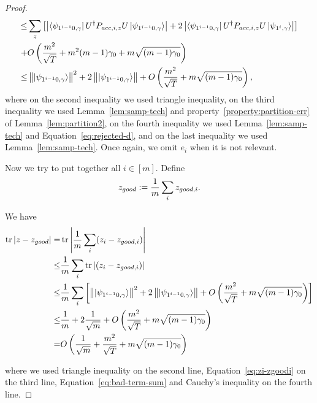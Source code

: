 \begin{proof}
\begin{align}
    \leq&  \sum_z   \L[\L| \bra{\psi_{1^{i-1}0,\gamma}}U^\dag  P_{acc,i,z}U    \ket{\psi_{1^{i-1}0,\gamma}} \R|+
    2  \L|\bra{\psi_{1^{i-1}0,\gamma}}U^\dag  P_{acc,i,z}U \ket{\psi_{1^i,\gamma}} \R|  \R]    \nn \\ +&O\L(\frac{m^2}{\sqrt T}+m^2{(m-1)\gamma_0}+m\sqrt{(m-1)\gamma_0}\R)\nn \\ %
    \leq& \norm{\ket{\psi_{1^{i-1}0,\gamma}}}^2+ 2\norm{\ket{\psi_{1^{i-1}0,\gamma}}}+O\L(\frac{m^2}{\sqrt T}+m\sqrt{(m-1)\gamma_0}\R),
\end{align}
where on the second inequality we used triangle inequality, on the third inequality we used  Lemma~\ref{lem:samp-tech} and property~\ref{property:partition-err} of Lemma~\ref{lem:partition2}, on the fourth inequality we used Lemma~\ref{lem:samp-tech} and Equation~\ref{eq:rejected-d}, and on the last inequality we used Lemma~\ref{lem:samp-tech}. Once again, we omit $e_i$ when it is not relevant. 







Now we try to  put together all $i\in [m]$. Define
$$z_{good}:= \frac{1}{m}\sum_i z_{good,i}.$$

We have 
\begin{align} \label{eq:z-z-good}
    \tr|z-z_{good}| =& \tr\L|\frac{1}{m}\sum_i (z_i-z_{good,i})\R| \nn \\
    \leq&  \frac{1}{m}\sum_i\tr| (z_i-z_{good,i})| \nn \\
    \leq&  \frac{1}{m}\sum_i\L[\norm{\ket{\psi_{1^{i-1}0,\gamma}}}^2+ 2\norm{\ket{\psi_{1^{i-1}0,\gamma}}}+O\L(\frac{m^2}{\sqrt T}+m\sqrt{(m-1)\gamma_0}\R)\R] \nn \\%
    \leq&  \frac{1}{m}+ 2\frac{1}{\sqrt m}+O\L(\frac{m^2}{\sqrt T}+m\sqrt{(m-1)\gamma_0}\R) \nn \\ %
    =&O\L( \frac{1}{\sqrt m}+\frac{m^2}{\sqrt T}+m\sqrt{(m-1)\gamma_0}\R)
\end{align}

where we used triangle inequality on the second line, Equation~\ref{eq:zi-zgoodi} on the third line, Equation~\ref{eq:bad-term-sum} and Cauchy's inequality on the fourth line.




\end{proof}
